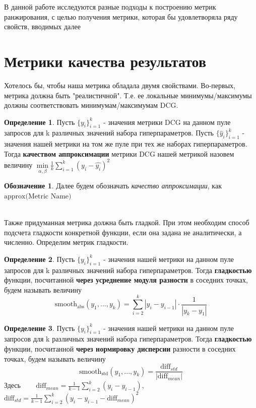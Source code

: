 \documentclass[12pt,a4paper]{amsart}
\theoremstyle{definition}
\newtheorem{definition}{Определение}[section]
\theoremstyle{definition}
\newtheorem{designation}{Обозначение}[section]
\newcommand{\Sum}{\sum\limits}
\renewcommand\i{\textit}
\renewcommand\t{\text}
\renewcommand\b{\textbf}
\begin{document}
В данной работе исследуются разные подходы к построению метрик ранжирования, с целью получения метрики, которая бы удовлетворяла ряду свойств, вводимых далее\\


\newpage
\section{Метрики качества результатов}

Хотелось бы, чтобы наша метрика обладала двумя свойствами. Во-первых, метрика должна быть "реалистичной". Т.е. ее локальные минимумы/максимумы должны соответствовать минимумам/максимумам DCG.
\begin{definition}
Пусть $\{y_i\}_{i=1}^k$ - значения метрики DCG на данном пуле запросов для k различных значений набора гиперпараметров. Пусть $\{\hat{y}_i\}_{i=1}^k$ - значения нашей метрики на том же пуле при тех же наборах гиперпараметров. Тогда \b{качеством аппроксимации} метрики DCG нашей метрикой назовем величину
$\underset{\alpha, \beta}{\min}\frac{1}{k}\Sum_{i=1}^k (y_i - \hat{y_i})^2$
\end{definition}

\begin{designation}
Далее будем обозначать \i{качество аппроксимации}, как $\t{approx(Metric Name)}$
\end{designation}

~\\

Также придуманная метрика должна быть гладкой. При этом необходим способ подсчета гладкости конкретной функции, если она задана не аналитически, а численно. Определим метрик гладкости.

\begin{definition}
Пусть $\{y_i\}_{i=1}^k$ - значения нашей метрики на данном пуле запросов для k различных значений набора гиперпараметров. Тогда \b{гладкостью} функции, посчитанной \b{через усреднение модуля разности} в соседних точках, будем называть величину 
$$\t{smooth}_\t{abs}(y_1,...,y_k) = \Sum_{i=2}^k |y_i - y_{i-1}| \cdot \frac{1}{|y_k - y_1|}$$
\end{definition}

\begin{definition}
Пусть $\{y_i\}_{i=1}^k$ - значения нашей метрики на данном пуле запросов для k различных значений набора гиперпараметров. Тогда \b{гладкостью} функции, посчитанной \b{через нормировку дисперсии} разности в соседних точках, будем называть величину 
$$\t{smooth}_\t{std}(y_1,...,y_k) = \frac{\t{diff}_{std}}{|\t{diff}_{mean}|}$$
Здесь ~~~ $\t{diff}_{mean} = \frac{1}{k - 1} \Sum_{i=2}^k (y_i - y_{i-1})$, ~~~
$\t{diff}_{std} = \frac{1}{k - 1} \Sum_{i=2}^k (y_i - y_{i-1} - \t{diff}_{mean})^2$
\end{definition}
\end{document}
